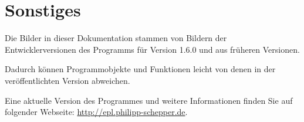 \chapter{Sonstiges}
Die Bilder in dieser Dokumentation stammen von Bildern der Entwicklerversionen des Programms für Version 1.6.0 und aus früheren Versionen.

Dadurch können Programmobjekte und Funktionen leicht von denen in der veröffentlichten Version abweichen.

Eine aktuelle Version des Programmes und weitere Informationen finden Sie auf folgender Webseite: \url{http://epl.philipp-schepper.de}.
